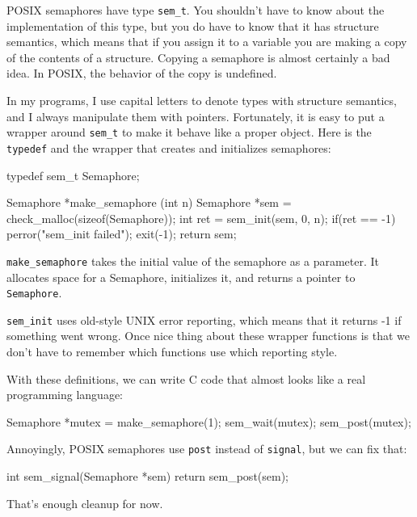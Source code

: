 \documentclass{book}
\begin{document}
POSIX semaphores have type {\tt sem\_t}.  You shouldn't have
to know about the implementation of this type, but you do
have to know that it has structure semantics, which means that
if you assign it to a variable you are making a copy of the
contents of a structure.  Copying a semaphore is almost certainly
a bad idea.  In POSIX, the behavior of the copy is undefined.

In my programs, I use capital letters to denote types with structure semantics, and I always manipulate them with pointers. Fortunately, it is easy to put a wrapper around {\tt sem\_t} to make it behave like a proper object.  Here is the {\tt typedef} and the wrapper that creates and initializes semaphores:

\begin{unbreakable}[title={}]{}
typedef sem_t Semaphore;

Semaphore *make_semaphore (int n) {
  Semaphore *sem = 
    check_malloc(sizeof(Semaphore));
  int ret = sem_init(sem, 0, n);
  if(ret == -1) {
    perror("sem_init failed");
    exit(-1);    
  }
  return sem;
}
\end{unbreakable}

{\tt make\_semaphore} takes the initial value of the semaphore
as a parameter.  It allocates space for a Semaphore, initializes
it, and returns a pointer to {\tt Semaphore}.

{\tt sem\_init} uses old-style UNIX error reporting, which means
that it returns -1 if something went wrong.  Once nice thing
about these wrapper functions is that we don't have to remember
which functions use which reporting style.

With these definitions, we can write C code that almost looks
like a real programming language:

\begin{unbreakable}[title={}]{}
Semaphore *mutex = make_semaphore(1);
sem_wait(mutex);
sem_post(mutex);
\end{unbreakable}

Annoyingly, POSIX semaphores use {\tt post} instead of
    {\tt signal}, but we can fix that:

\begin{unbreakable}[title={}]{}
int sem_signal(Semaphore *sem) {
  return sem_post(sem);
}
\end{unbreakable}

That's enough cleanup for now.
\end{document}
